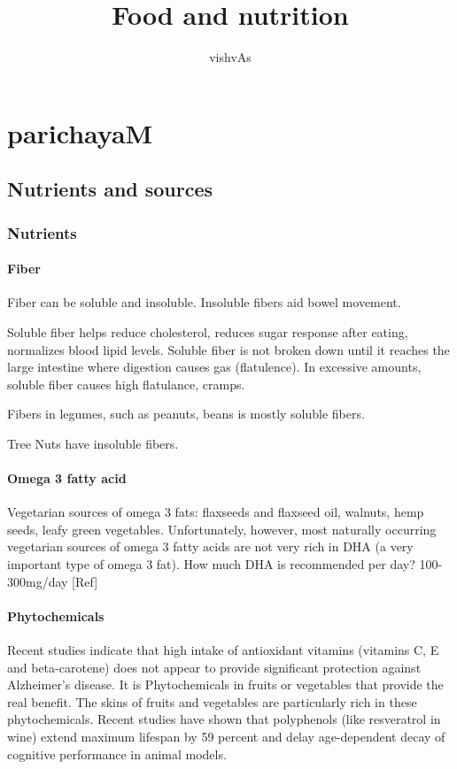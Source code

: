 \documentclass[oneside, article]{memoir}
\title{Food and nutrition}
\author{vishvAs}
\begin{document}
\maketitle

\part{parichayaM}
\chapter{Nutrients and sources}
\section{Nutrients}
\subsection{Fiber}
Fiber can be soluble and insoluble. Insoluble fibers aid bowel movement.

Soluble fiber helps reduce cholesterol, reduces sugar response after eating, normalizes blood lipid levels. Soluble fiber is not broken down until it reaches the large intestine where digestion causes gas (flatulence). In excessive amounts, soluble fiber causes high flatulance, cramps.


Fibers in legumes, such as peanuts, beans is mostly soluble fibers.

Tree Nuts have insoluble fibers.

\subsection{Omega 3 fatty acid}
Vegetarian sources of omega 3 fats: flaxseeds and flaxseed oil, walnuts, hemp seeds, leafy green vegetables. Unfortunately, however, most naturally occurring vegetarian sources of omega 3 fatty acids are not very rich in DHA (a very important type of omega 3 fat). How much DHA is recommended per day? 100-300mg/day [Ref]

\subsection{Phytochemicals}
Recent studies indicate that high intake of antioxidant vitamins (vitamins C, E and beta-carotene) does not appear to provide significant protection against Alzheimer's disease. It is Phytochemicals in fruits or vegetables that provide the real benefit. The skins of fruits and vegetables are particularly rich in these phytochemicals. Recent studies have shown that polyphenols (like resveratrol in wine) extend maximum lifespan by 59 percent and delay age-dependent decay of cognitive performance in animal models.
\end{document}
